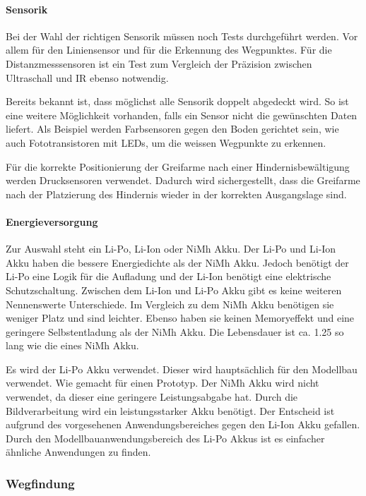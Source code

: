  \paragraph{Sensorik}
 Bei der Wahl der richtigen Sensorik müssen noch Tests durchgeführt werden. Vor allem für den Liniensensor und für die Erkennung des Wegpunktes. Für die Distanzmesssensoren ist ein Test zum Vergleich der Präzision zwischen Ultraschall und IR ebenso notwendig.
 
 Bereits bekannt ist, dass  möglichst alle Sensorik doppelt abgedeckt wird. So ist eine weitere Möglichkeit vorhanden, falls ein Sensor nicht die gewünschten Daten liefert. Als Beispiel werden Farbsensoren gegen den Boden gerichtet sein, wie auch Fototransistoren mit LEDs, um die weissen Wegpunkte zu erkennen.

 Für die korrekte Positionierung der Greifarme nach einer Hindernisbewältigung werden Drucksensoren verwendet. Dadurch wird sichergestellt, dass die Greifarme nach der Platzierung des Hindernis wieder in der korrekten Ausgangslage sind.

  \paragraph{Energieversorgung}
  Zur Auswahl steht ein Li-Po, Li-Ion oder NiMh Akku. Der Li-Po und Li-Ion Akku haben die bessere Energiedichte als der NiMh Akku. Jedoch benötigt der Li-Po eine Logik für die Aufladung und der Li-Ion benötigt eine elektrische Schutzschaltung. Zwischen dem Li-Ion und Li-Po Akku gibt es keine weiteren Nennenswerte Unterschiede. 
  Im Vergleich zu dem NiMh Akku benötigen sie weniger Platz und sind leichter. Ebenso haben sie keinen Memoryeffekt und eine geringere Selbstentladung als der NiMh Akku. Die Lebensdauer ist ca. 1.25 so lang wie die eines NiMh Akku.

  Es wird der Li-Po Akku verwendet. Dieser wird hauptsächlich für den Modellbau verwendet. Wie gemacht für einen Prototyp. Der NiMh Akku wird nicht verwendet, da dieser eine geringere Leistungsabgabe hat. Durch die Bildverarbeitung wird ein leistungsstarker Akku benötigt. Der Entscheid ist aufgrund des vorgesehenen Anwendungsbereiches gegen den Li-Ion Akku gefallen. Durch den Modellbauanwendungsbereich des Li-Po Akkus ist es einfacher ähnliche Anwendungen zu finden.

\newpage
\subsubsection{Wegfindung}

